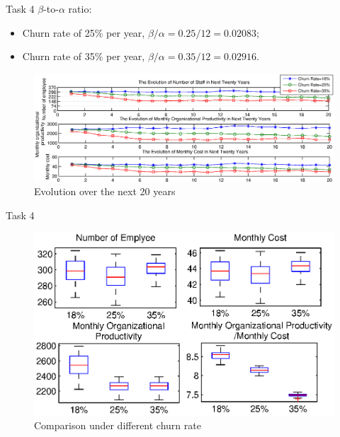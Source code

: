 \documentclass{beamer}
\begin{document}
\begin{frame}{Task 4}
$\beta$-to-$\alpha$ ratio: 
\begin{itemize}
\item Churn rate of 25\% per year, $\beta/\alpha = 0.25/12 = 0.02083$;
\item Churn rate of 35\% per year, $\beta/\alpha = 0.35/12 = 0.02916$.
\end{itemize}


\begin{figure}
\centering
\includegraphics[width=\textwidth]{fig/task-4-1.eps}
\caption{Evolution over the next 20 years}
\end{figure}
\end{frame}

\begin{frame}{Task 4}
\begin{figure}
\centering
\includegraphics[width=\textwidth]{fig/task-4-2.eps}
\caption{Comparison under different churn rate}
\end{figure}
\end{frame}
\end{document}
